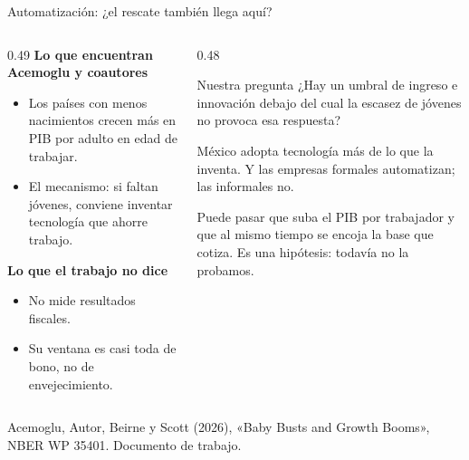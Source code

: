 \documentclass[aspectratio=169,11pt]{beamer}
\newcommand{\fuente}[1]{\par\vfill{\small\color{cGris}#1\par}}
\begin{document}
\begin{frame}{Automatización: ¿el rescate también llega aquí?}
  \begin{columns}[T]
    \begin{column}{0.49\textwidth}
      \textbf{Lo que encuentran Acemoglu y coautores}
      \begin{itemize}
        \item Los países con menos nacimientos crecen más en PIB por adulto en edad de trabajar.
        \item El mecanismo: si faltan jóvenes, conviene inventar tecnología que ahorre trabajo.
      \end{itemize}
      \pause
      \textbf{Lo que el trabajo no dice}
      \begin{itemize}
        \item No mide resultados fiscales.
        \item Su ventana es casi toda de bono, no de envejecimiento.
      \end{itemize}
    \end{column}
    \begin{column}{0.48\textwidth}
      \pause
      \begin{alertblock}{Nuestra pregunta}
        ¿Hay un umbral de ingreso e innovación debajo del cual la escasez de jóvenes no provoca esa respuesta?
      \end{alertblock}
      \medskip
      México adopta tecnología más de lo que la inventa. Y las empresas formales automatizan; las informales no.
      \par\medskip
      Puede pasar que suba el PIB por trabajador y que al mismo tiempo se encoja la base que cotiza. Es una hipótesis: todavía no la probamos.
    \end{column}
  \end{columns}
  \fuente{Acemoglu, Autor, Beirne y Scott (2026), «Baby Busts and Growth Booms», NBER WP 35401. Documento de trabajo.}
\end{frame}
\end{document}
